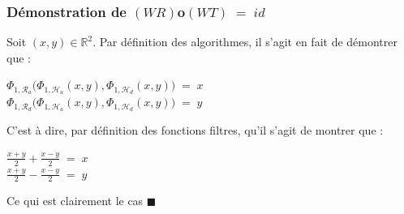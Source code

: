 \documentclass[10pt]{beamer}
\begin{document}
    \begin{frame}
      \frametitle{D\'{e}monstration de $(WR)$o$(WT) \; = \; id$}
      
      Soit $(x, y) \in \mathbb{R}^2$.
      Par d\'{e}finition des algorithmes, il s'agit en fait de d\'{e}montrer que :
      
      \begin{center}
	$ \Phi_{1, \mathcal{R}_a} \Big(\Phi_{1, \mathcal{H}_a}(x, y), \Phi_{1, \mathcal{H}_d}(x, y) \Big) \; = \; x $ \\
	$ \Phi_{1, \mathcal{R}_d} \Big(\Phi_{1, \mathcal{H}_a}(x, y), \Phi_{1, \mathcal{H}_d}(x, y) \Big) \; = \; y $
      \end{center}
      
      C'est \`{a} dire, par d\'{e}finition des fonctions filtres, qu'il s'agit de montrer que :
      
      \begin{center}
	$ \frac{x + y}{2} + \frac{x - y}{2} \; = \; x $ \\
	$ \frac{x + y}{2} - \frac{x - y}{2} \; = \; y $
      \end{center}
      
      Ce qui est clairement le cas  $\blacksquare$
    \end{frame}
    
\end{document}
